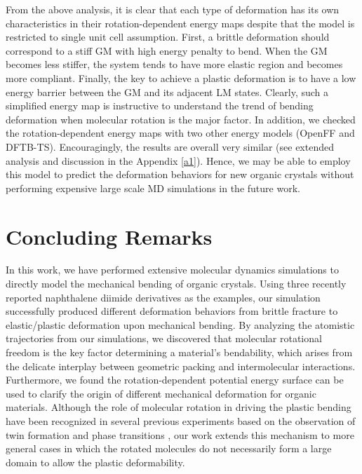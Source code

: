 \documentclass[prb,superscriptaddress,longbibliography, twocolumn]{revtex4-1}
\begin{document}
From the above analysis, it is clear that each type of deformation has its own characteristics in their rotation-dependent energy maps despite that the model is restricted to single unit cell assumption. First, a brittle deformation should correspond to a stiff GM with high energy penalty to bend. When the GM becomes less stiffer, the system tends to have more elastic region and becomes more compliant. Finally, the key to achieve a plastic deformation is to have a low energy barrier between the GM and its adjacent LM states. Clearly, such a simplified energy map is instructive to understand the trend of bending deformation when molecular rotation is the major factor. In addition, we checked the rotation-dependent energy maps with two other energy models (OpenFF and DFTB-TS). Encouragingly, the results are overall very similar (see extended analysis and discussion in the Appendix \ref{a1}). Hence, we may be able to employ this model to predict the deformation behaviors for new organic crystals without performing expensive large scale MD simulations in the future work.

\section{Concluding Remarks}
In this work, we have performed extensive molecular dynamics simulations to directly model the mechanical bending of organic crystals. Using three recently reported naphthalene diimide derivatives as the examples, our simulation successfully produced different deformation behaviors from brittle fracture to elastic/plastic deformation upon mechanical bending. By analyzing the atomistic trajectories from our simulations, we discovered that molecular rotational freedom is the key factor determining a material's bendability, which arises from the delicate interplay between geometric packing and intermolecular interactions. Furthermore, we found the rotation-dependent potential energy surface can be used to clarify the origin of different mechanical deformation for organic materials. Although the role of molecular rotation in driving the plastic bending have been recognized in several previous experiments based on the observation of twin formation and phase transitions \cite{Takamizawa2013Superelastic, karothu2016shape, takamizawa2018superplasticity}, our work extends this mechanism to more general cases in which the rotated molecules do not necessarily form a large domain to allow the plastic deformability.
\end{document}
